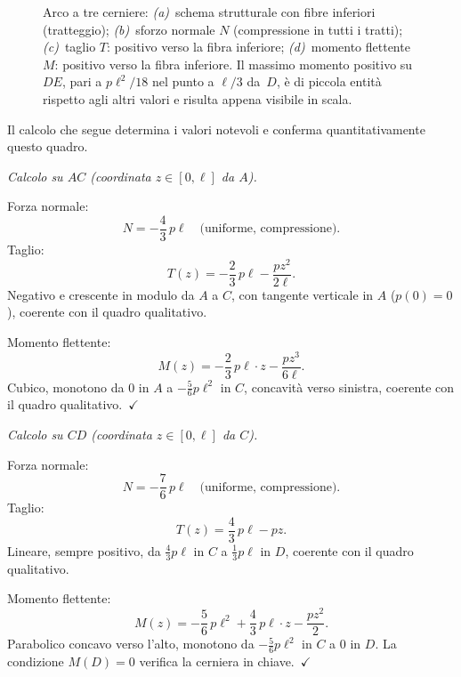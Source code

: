 \begin{figure}[htbp]
{%
}%
\caption{Arco a tre cerniere:
	\emph{(a)}~schema strutturale con fibre inferiori (tratteggio);
	\emph{(b)}~sforzo normale $N$ (compressione in tutti i tratti);
	\emph{(c)}~taglio $T$: positivo verso la fibra inferiore;
	\emph{(d)}~momento flettente $M$: positivo verso la fibra inferiore.
	Il massimo momento positivo su~$DE$, pari a $p\ell^2/18$
	nel punto a $\ell/3$ da~$D$, è di piccola entità rispetto
	agli altri valori e risulta appena visibile in scala.}
\label{fig:arco3c_NTM}
\end{figure}



\medskip
Il calcolo che segue determina i valori notevoli
e conferma quantitativamente questo quadro.

\medskip
\noindent\textit{Calcolo su $AC$
(coordinata $z \in [0,\ell]$ da $A$).}

\noindent Forza normale:
\[
N = -\frac{4}{3}\,p\ell
\quad\text{(uniforme, compressione).}
\]
Taglio:
\[
T(z) = -\frac{2}{3}\,p\ell - \frac{pz^2}{2\ell}.
\]
Negativo e crescente in modulo da $A$ a $C$,
con tangente verticale in $A$ ($p(0)=0$),
coerente con il quadro qualitativo.

\noindent Momento flettente:
\[
M(z) = -\frac{2}{3}\,p\ell\cdot z - \frac{pz^3}{6\ell}.
\]
Cubico, monotono da $0$ in $A$ a $-\tfrac{5}{6}p\ell^2$
in $C$, concavità verso sinistra, coerente con il quadro qualitativo.~$\checkmark$

\medskip
\noindent\textit{Calcolo su $CD$
(coordinata $z \in [0,\ell]$ da $C$).}

\noindent Forza normale:
\[
N = -\frac{7}{6}\,p\ell
\quad\text{(uniforme, compressione).}
\]
Taglio:
\[
T(z) = \frac{4}{3}\,p\ell - pz.
\]
Lineare, sempre positivo, da $\tfrac{4}{3}p\ell$
in $C$ a $\tfrac{1}{3}p\ell$ in $D$,
coerente con il quadro qualitativo.

\noindent Momento flettente:
\[
M(z) = -\frac{5}{6}\,p\ell^2
+ \frac{4}{3}\,p\ell\cdot z - \frac{pz^2}{2}.
\]
Parabolico concavo verso l'alto, monotono da
$-\tfrac{5}{6}p\ell^2$ in $C$ a $0$ in $D$.
La condizione $M(D)=0$ verifica la cerniera
in chiave.~$\checkmark$

